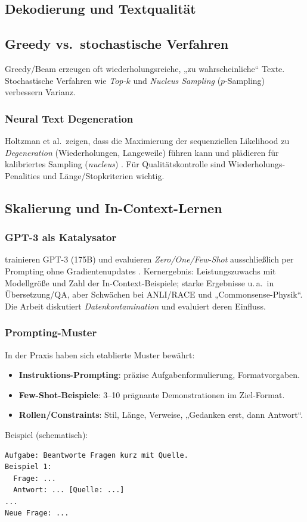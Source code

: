 \subsection{Dekodierung und Textqualität}
\subsection{Greedy vs.\ stochastische Verfahren}
Greedy/Beam erzeugen oft wiederholungsreiche, „zu wahrscheinliche“ Texte. Stochastische Verfahren wie \emph{Top-$k$} und \emph{Nucleus Sampling} ($p$-Sampling) verbessern Varianz. 

\subsubsection{Neural Text Degeneration}
Holtzman et al.\ zeigen, dass die Maximierung der sequenziellen Likelihood zu \emph{Degeneration} (Wiederholungen, Langeweile) führen kann und plädieren für kalibriertes Sampling (\emph{nucleus}) \cite{holtzman2020curious}. Für Qualitätskontrolle sind Wiederholungs-Penalities und Länge/Stopkriterien wichtig. 

\subsection{Skalierung und In-Context-Lernen}
\subsubsection{GPT-3 als Katalysator}
\citeauthor{brown2020language} trainieren GPT-3 (175B) und evaluieren \emph{Zero/One/Few-Shot} ausschließlich per Prompting ohne Gradientenupdates \cite{brown2020language}. Kernergebnis: Leistungszuwachs mit Modellgröße und Zahl der In-Context-Beispiele; starke Ergebnisse u.\,a.\ in Übersetzung/QA, aber Schwächen bei ANLI/RACE und „Commonsense-Physik“. Die Arbeit diskutiert \emph{Datenkontamination} und evaluiert deren Einfluss. 

\subsubsection{Prompting-Muster}
In der Praxis haben sich etablierte Muster bewährt:
\begin{itemize}
  \item \textbf{Instruktions-Prompting}: präzise Aufgabenformulierung, Formatvorgaben.
  \item \textbf{Few-Shot-Beispiele}: 3–10 prägnante Demonstrationen im Ziel-Format.
  \item \textbf{Rollen/Constraints}: Stil, Länge, Verweise, „Gedanken erst, dann Antwort“.
\end{itemize}
\noindent Beispiel (schematisch):
\begin{verbatim}
Aufgabe: Beantworte Fragen kurz mit Quelle.
Beispiel 1:
  Frage: ...
  Antwort: ... [Quelle: ...]
...
Neue Frage: ...
\end{verbatim}

